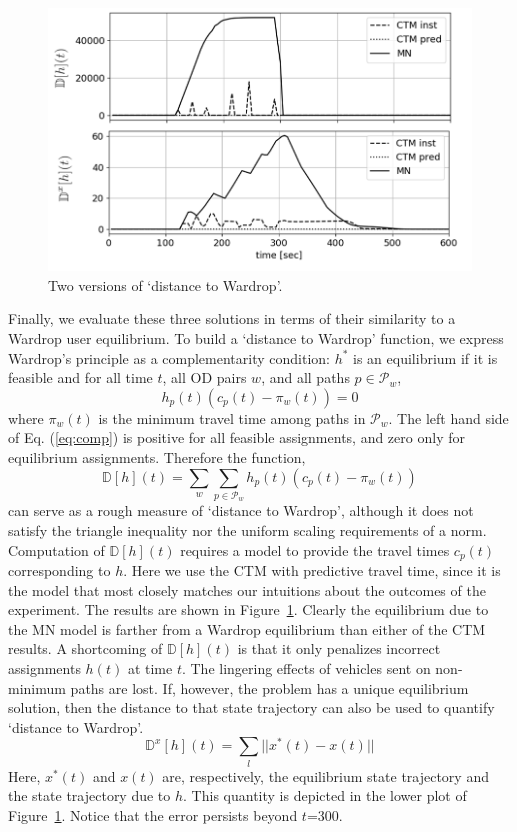 \begin{figure}[ht]
    \centering
    \includegraphics[width=0.9\linewidth]{figs/DWardrop.png}
    \caption{Two versions of `distance to Wardrop'.}
    \label{fig:dWardrop}
\end{figure}


Finally, we evaluate these three solutions in terms of their similarity to a Wardrop user equilibrium. To build a `distance to Wardrop' function, we express Wardrop's principle as a complementarity condition: $h^*$ is an equilibrium  if it is feasible and for all time $t$, all OD pairs $w$, and all paths $p\in\mathcal{P}_w$,
\begin{equation}
\label{eq:comp}
h_p(t)\left(c_p(t)-\pi_w(t)\right) = 0
\end{equation}
where $\pi_w(t)$ is the minimum travel time among paths in $\mathcal{P}_w$. The left hand side of Eq. (\ref{eq:comp}) is positive for all feasible assignments, and zero only for equilibrium assignments. Therefore the function,
\begin{equation}
\mathbb{D}[h](t) =\sum_w \sum_{p\in\mathcal{P}_w} h_p(t)\left(c_p(t)-\pi_w(t)\right)
\end{equation}
can serve as a rough measure of `distance to Wardrop', although it does not satisfy the triangle inequality nor the uniform scaling requirements of a norm. Computation of $\mathbb{D}[h](t)$ requires a model to provide the travel times $c_p(t)$ corresponding to $h$. Here we use the CTM with predictive travel time, since it is the model that most closely matches our intuitions about the outcomes of the experiment. The results are shown in Figure~\ref{fig:dWardrop}. Clearly the equilibrium due to the MN model is farther from a Wardrop equilibrium than either of the CTM results. A shortcoming of $\mathbb{D}[h](t)$ is that it only penalizes incorrect assignments $h(t)$ at time $t$. The lingering effects of vehicles sent on non-minimum paths are lost. If, however, the problem has a unique equilibrium solution, then the distance to that state trajectory can also be used to quantify `distance to Wardrop'.
\begin{equation}
\mathbb{D}^x[h](t) = \sum_{l} ||x^{*}(t)-x(t)||
\end{equation}
Here, $x^{*}(t)$ and $x(t)$ are, respectively, the equilibrium state trajectory and the state trajectory due to $h$. This quantity is depicted in the lower plot of Figure~\ref{fig:dWardrop}. Notice that the error persists beyond $t$=300.